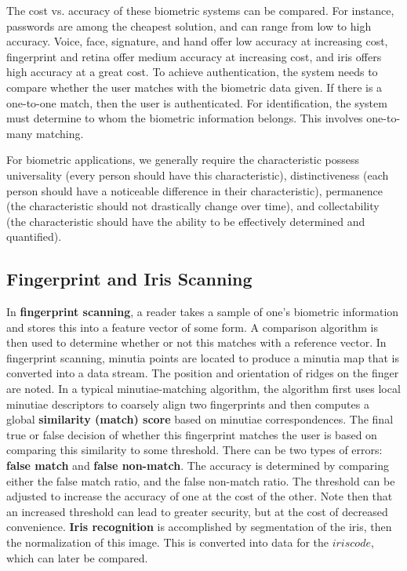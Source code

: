 \documentclass[11pt]{article}
\theoremstyle{plain} %
\theoremstyle{definition}
\theoremstyle{example}
\theoremstyle{remark}
\begin{document}
The cost vs. accuracy of these biometric systems can be compared. For instance, passwords are among the cheapest solution, and can range from low to high accuracy. Voice, face, signature, and hand offer low accuracy at increasing cost, fingerprint and retina offer medium accuracy at increasing cost, and iris offers high accuracy at a great cost. To achieve authentication, the system needs to compare whether the user matches with the biometric data given. If there is a one-to-one match, then the user is authenticated. For identification, the system must determine to whom the biometric information belongs. This involves one-to-many matching. 

For biometric applications, we generally require the characteristic possess universality (every person should have this characteristic), distinctiveness (each person should have a noticeable difference in their characteristic), permanence (the characteristic should not drastically change over time), and collectability (the characteristic should have the ability to be effectively determined and quantified).

\subsection{Fingerprint and Iris Scanning}

In \textbf{fingerprint scanning}, a reader takes a sample of one's biometric information and stores this into a feature vector of some form. A comparison algorithm is then used to determine whether or not this matches with a reference vector. In fingerprint scanning, minutia points are located to produce a minutia map that is converted into a data stream. The position and orientation of ridges on the finger are noted. In a typical minutiae-matching algorithm, the algorithm first uses local minutiae descriptors to coarsely align two fingerprints and then computes a global \textbf{similarity (match) score}  based on minutiae correspondences. The final true or false decision of whether this fingerprint matches the user is based on comparing this similarity to some threshold. There can be two types of errors: \textbf{false match} and \textbf{false non-match}. The accuracy is determined by comparing either the false match ratio, and the false non-match ratio. The threshold can be adjusted to increase the accuracy of one at the cost of the other. Note then that an increased threshold can lead to greater security, but at the cost of decreased convenience. \textbf{Iris recognition} is accomplished by segmentation of the iris, then the normalization of this image. This is converted into data for the $iriscode$, which can later be compared.
\end{document}
